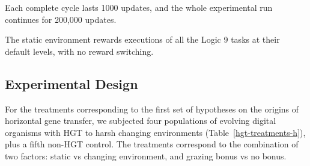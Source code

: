\documentclass[PhD]{msu-thesis}
\begin{document}
Each complete cycle lasts 1000 updates, and the whole experimental run continues for 200,000 updates.

The static environment rewards executions of all the Logic 9 tasks at their default levels, with no reward switching.



\subsection{Experimental Design}
For the treatments corresponding to the first set of hypotheses on the origins of horizontal gene transfer, we subjected four populations of evolving digital organisms with HGT to harsh changing environments (Table~\ref{hgt-treatments-h}), plus a fifth non-HGT control. The treatments correspond to the combination of two factors: static vs changing environment, and grazing bonus vs no bonus.
\end{document}
